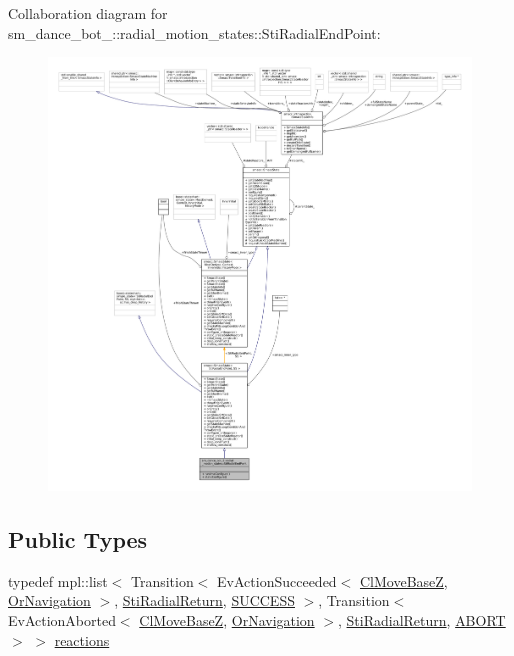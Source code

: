 Collaboration diagram for sm\+\_\+dance\+\_\+bot\+\_\+:\+:radial\+\_\+motion\+\_\+states\+:\+:Sti\+Radial\+End\+Point\+:
\nopagebreak
\begin{figure}[H]
\begin{center}
\leavevmode
\includegraphics[width=350pt]{structsm__dance__bot__2_1_1radial__motion__states_1_1StiRadialEndPoint__coll__graph}
\end{center}
\end{figure}
\subsection*{Public Types}
\begin{DoxyCompactItemize}
\item 
typedef mpl\+::list$<$ Transition$<$ Ev\+Action\+Succeeded$<$ \hyperlink{classmove__base__z__client_1_1ClMoveBaseZ}{Cl\+Move\+BaseZ}, \hyperlink{classsm__dance__bot__2_1_1OrNavigation}{Or\+Navigation} $>$, \hyperlink{structsm__dance__bot__2_1_1radial__motion__states_1_1StiRadialReturn}{Sti\+Radial\+Return}, \hyperlink{classSUCCESS}{S\+U\+C\+C\+E\+SS} $>$, Transition$<$ Ev\+Action\+Aborted$<$ \hyperlink{classmove__base__z__client_1_1ClMoveBaseZ}{Cl\+Move\+BaseZ}, \hyperlink{classsm__dance__bot__2_1_1OrNavigation}{Or\+Navigation} $>$, \hyperlink{structsm__dance__bot__2_1_1radial__motion__states_1_1StiRadialReturn}{Sti\+Radial\+Return}, \hyperlink{classABORT}{A\+B\+O\+RT} $>$ $>$ \hyperlink{structsm__dance__bot__2_1_1radial__motion__states_1_1StiRadialEndPoint_aaebea73169bfa6a632a0164dd9165376}{reactions}
\end{DoxyCompactItemize}
